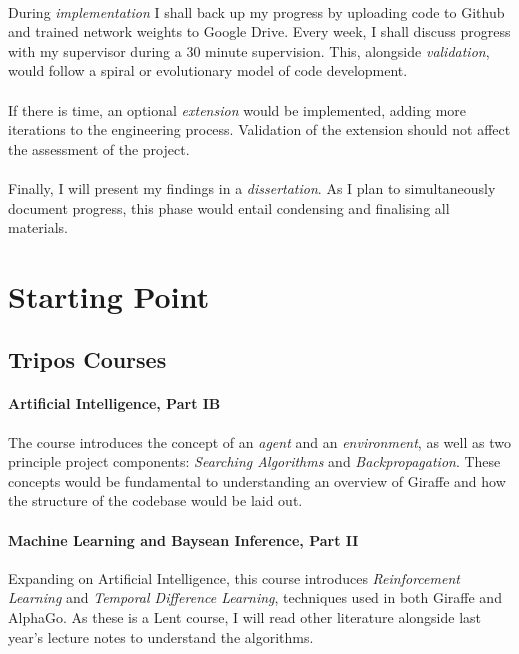 \documentclass[12pt,a4paper]{book}
\begin{document}
\paragraph{}During \textit{implementation} I shall back up my progress by uploading code to Github and trained network weights to Google Drive. Every week, I shall discuss progress with my supervisor during a 30 minute supervision. This, alongside \textit{validation}, would follow a spiral or evolutionary model of code development.

\paragraph{}If there is time, an optional \textit{extension} would be implemented, adding more iterations to the engineering process. Validation of the extension should not affect the assessment of the project.

\paragraph{}Finally, I will present my findings in a \textit{dissertation}. As I plan to simultaneously document progress, this phase would entail condensing and finalising all materials.


\section*{Starting Point}

\subsection*{Tripos Courses}

\paragraph{Artificial Intelligence, Part IB} The course introduces the concept of an \textit{agent} and an \textit{environment}, as well as two principle project components: \textit{Searching Algorithms} and \textit{Backpropagation}. These concepts would be fundamental to understanding an overview of Giraffe and how the structure of the codebase would be laid out.

\paragraph{Machine Learning and Baysean Inference, Part II} Expanding on Artificial Intelligence, this course introduces \textit{Reinforcement Learning} and \textit{Temporal Difference Learning}, techniques used in both Giraffe and AlphaGo. As these is a Lent course, I will read other literature alongside last year's lecture notes to understand the algorithms.
\end{document}
